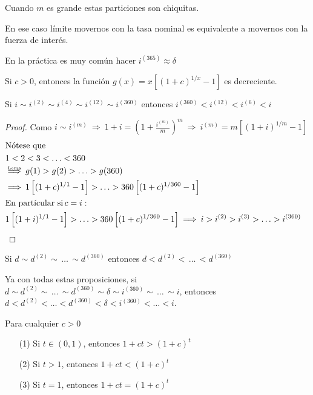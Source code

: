 Cuando $m$ es grande estas particiones son chiquitas.

En ese caso límite movernos con la tasa nominal es equivalente a movernos con la fuerza de interés.

En la práctica es muy común hacer $i^{(365)}\approx \delta$

\begin{lemma}
Si $c>0$, entonces la función \uline{$g(x) = x\left[(1+c)^{1/x} -1\right] $} es decreciente.
\end{lemma}
\begin{proposition}
Si $i\sim i^{(2)} \sim i^{(4)} \sim i^{(12)} \sim i^{(360)}$ entonces $i^{(360)}<i^{(12)}<i^{(6)}<i$
\end{proposition}
\begin{proof}
Como $i\sim i^{(m)} \: \Rightarrow \: 1+i = \left( 1 + \frac{i^{(m)}}{m}\right)^{m} \: \Rightarrow \: i^{(m)} = m \left[(1+i)^{1/m}-1\right]  $
\begin{align*}
&\text{Nótese que}&\\
&1<2<3<\ldots<360&\\
&\mathrel{\stackon[1pt]{$\Longrightarrow$}{$\scriptscriptstyle \text{Lema}$}} \: g(1)>g(2)>\ldots>g(360)&\\
&\Longrightarrow \: 1\left[(1+c)^{1/1} -1\right]>\ldots>360\left[(1+c)^{1/360}-1 \right]&\\
&\text{En partícular si}\, c=i:\\
&1\left[(1+i)^{1/1}-1 \right]>\ldots>360\left[(1+c)^{1/360}-1 \right] \: \Longrightarrow \: i>i^{(2)}>i^{(3)}>\ldots>i^{(360)}&   
\end{align*}
\end{proof}
\begin{proposition}
Si $d\sim d^{(2)}\sim \, \ldots \, \sim d^{(360)}$ entonces $d<d^{(2)}<\,\ldots \, <d^{(360)}$
\end{proposition}
Ya con todas estas proposiciones, si $d\sim d^{(2)}\sim \, \ldots \, \sim d^{(360)} \sim \delta \sim i^{(360)} \sim \, \ldots \, \sim i$, entonces $d<d^{(2)}<\ldots<d^{(360)} < \delta < i^{(360)}<\ldots<i$.
\begin{lemma}
Para cualquier $c>0$
\begin{enumerate}
\item[(1)] Si $t\in(0,1)$, entonces $1+ct > (1+c)^t$
\item[(2)] Si $t>1$, entonces $1+ct < (1+c)^t$
\item[(3)] Si $t=1$, entonces $1+ct = (1+c)^t$
\end{enumerate}
\end{lemma}
